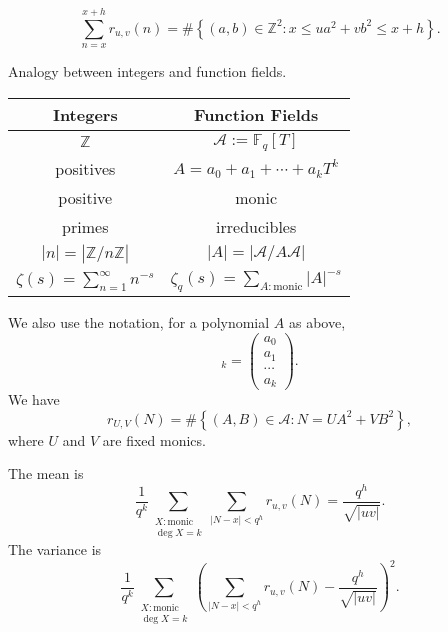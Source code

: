 \documentclass[reqno]{amsart} 
\begin{document}
\begin{equation*}
  \sum_{n = x}^{x + h}
  r_{u, v} (n) = \# \left\{ (a, b) \in \mathbb{Z}^2 : x \leq u a^2 + v b^2 \leq x + h \right\}.
\end{equation*}


Analogy between integers and function fields.
\begin{tabular}{|c|c|}
  \hline
  Integers & Function Fields \\
  \hline
  $\mathbb{Z}$  & $\mathcal{A} := \mathbb{F}_q [T]$ \\
  \hline
  positives & $A = a_0 + a_1 + \dotsb + a_k T^k$ \\
  \hline
  positive & monic \\
  \hline
  primes & irreducibles \\
  \hline
  $|n| = |\mathbb{Z}/n \mathbb{Z}|$ & $\lvert A \rvert = \lvert \mathcal{A} / A \mathcal{A}  \rvert$ \\
  \hline
  $\zeta (s) = \sum_{n = 1}^\infty n^{- s}$ & $\zeta_q (s) = \sum_{A :\text{monic}} \lvert A \rvert^{- s}$ \\
  \hline
\end{tabular}
We also use the notation, for a polynomial $A$ as above,
\begin{equation*} [A]_k =
  \begin{pmatrix}
    a_0  \\
    a_1  \\
    \dotsb  \\
    a_k
  \end{pmatrix}.
\end{equation*}
We have
\begin{equation*}
r_{U, V} (N) = \# \left\{ (A, B) \in \mathcal{A} : N = U A^2 + V B^2  \right\},
\end{equation*}
where $U$ and $V$ are fixed monics.

The mean is
\begin{equation*}
  \frac{1}{ q^k }
  \sum_{
    \substack{
      X : \text{monic}  \\
       \deg X = k
    }
  }
  \sum_{\lvert N - x \rvert < q^h }
  r_{u, v} (N) = \frac{q^h }{\sqrt{\lvert u v \rvert}}.
\end{equation*}
The variance is
\begin{equation}\label{eqn:d1bc66f48d40}
   \frac{1}{ q^k }
  \sum_{
    \substack{
      X : \text{monic}  \\
       \deg X = k
    }
  }
\left(   \sum_{\lvert N - x \rvert < q^h }
  r_{u, v} (N) - \frac{q^h }{\sqrt{\lvert u v \rvert}} \right)^2.
\end{equation}
\end{document}
